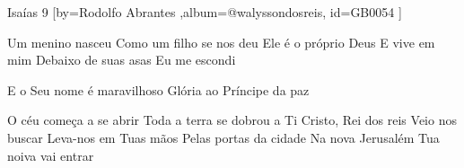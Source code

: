\beginsong
{Isaías 9 %
}[by={Rodolfo Abrantes  %
},album={@walyssondosreis},
id={GB0054 %
}] 

\beginverse*
Um menino nasceu
Como um filho se nos deu
Ele é o próprio Deus
E vive em mim
Debaixo de suas asas
Eu me escondi
\endverse

\beginverse*
E o Seu nome é maravilhoso
Glória ao Príncipe da paz
\endverse

\beginchorus 
O céu começa a se abrir
Toda a terra se dobrou a Ti
Cristo, Rei dos reis
Veio nos buscar
Leva-nos em Tuas mãos
Pelas portas da cidade
Na nova Jerusalém
Tua noiva vai entrar
\endchorus

\begin{comment}
\lstset{basicstyle=\scriptsize\bf} %
\tab{Solo 1}
\begin{lstlisting}
E|-----------------------------------------------------|
B|-----------------------------------------------------|
G|-----------------------------------------------------|
D|-----------------------------------------------------|
A|-----------------------------------------------------|
E|-----------------------------------------------------|
\end{lstlisting}
\end{comment}
\vspace{2em}
%
%
% 
% 
\endsong
\begin{comment}

\end{comment}